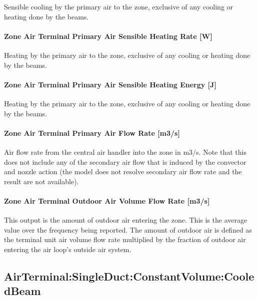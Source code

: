 Sensible cooling by the primary air to the zone, exclusive of any cooling or heating done by the beams.

\paragraph{Zone Air Terminal Primary Air Sensible Heating Rate {[}W{]}}\label{zone-air-terminal-primary-air-sensible-heating-rate-w}

Heating by the primary air to the zone, exclusive of any cooling or heating done by the beams.

\paragraph{Zone Air Terminal Primary Air Sensible Heating Energy {[}J{]}}\label{zone-air-terminal-primary-air-sensible-heating-energy-j}

Heating by the primary air to the zone, exclusive of any cooling or heating done by the beams.

\paragraph{Zone Air Terminal Primary Air Flow Rate {[}m3/s{]}}\label{zone-air-terminal-primary-air-flow-rate-m3s}

Air flow rate from the central air handler into the zone in m3/s. Note that this does not include any of the secondary air flow that is induced by the convector and nozzle action (the model does not resolve secondary air flow rate and the result are not available).

\paragraph{Zone Air Terminal Outdoor Air Volume Flow Rate {[}m3/s{]}}

This output is the amount of outdoor air entering the zone. This is the average value over the frequency being reported. The amount of outdoor air is defined as the terminal unit air volume flow rate multiplied by the fraction of outdoor air entering the air loop's outside air system.

\subsection{AirTerminal:SingleDuct:ConstantVolume:CooledBeam}\label{airterminalsingleductconstantvolumecooledbeam}

